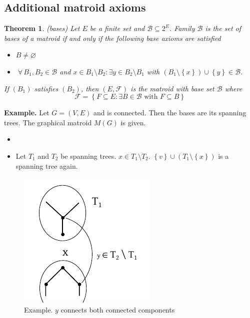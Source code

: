 \documentclass{article}
\newtheorem{theorem}{Theorem}
\newcommand{\set}[1]{\left\{#1\right\}}
\newcommand{\fall}{\;\forall\,}
\begin{document}
\subsection{Additional matroid axioms}
%
\begin{theorem}
  \label{satz-8.5}
  (bases)
  Let $E$ be a finite set and $\mathcal{B} \subseteq 2^E$. Family $\mathcal{B}$ is the set of bases of a matroid if and only if the following base axioms are satisfied
  \begin{itemize}
    \item[(B1)] $B \neq \diameter$
    \item[(B2)] $\fall B_1, B_2 \in \mathcal{B}$ and $x \in B_1 \setminus B_2: \exists y \in B_2 \setminus B_1$ with $(B_1 \setminus \set{x}) \cup \set{y} \in \mathcal{B}$.
  \end{itemize}
  If $(B_1)$ satisfies $(B_2)$, then $(E, \mathcal{F})$ is the matroid with base set $\mathcal{B}$ where
  \[ \mathcal{F} = \set{F \subseteq E: \exists B \in \mathcal{B} \text{ with } F \subseteq B} \]
\end{theorem}

\textbf{Example.}
  Let $G = (V, E)$ and is connected. Then the bases are its spanning trees. The graphical matroid $M(G)$ is given.
  \begin{itemize}
    \item[(B1)]
    \item[(B2)] Let $T_1$ and $T_2$ be spanning trees. $x \in T_1 \setminus T_2$. $\set{v} \cup (T_1 \setminus \set{x})$ is a spanning tree again.
  \end{itemize}

  \begin{figure}[!ht]
    \begin{center}
      \includegraphics{img/matroid_axioms_example.pdf}
      \caption{Example. $y$ connects both connected components}
    \end{center}
  \end{figure}
\end{document}
